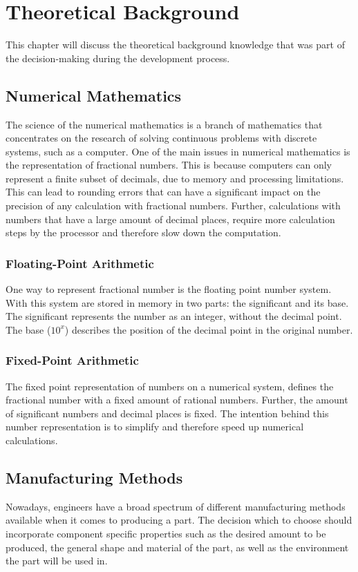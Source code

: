 \chapter{Theoretical Background}
\label{theoretical_background}
 
This chapter will discuss the theoretical background knowledge that was part of the decision-making during the development process.
 
\section{Numerical Mathematics}
The science of the numerical mathematics is a branch of mathematics that concentrates on the research of solving continuous problems with discrete systems, such as a computer.
One of the main issues in numerical mathematics is the representation of fractional numbers. This is because computers can only represent a finite subset of decimals, due to memory and processing limitations.
This can lead to rounding errors that can have a significant impact on the precision of any calculation with fractional numbers.
Further, calculations with numbers that have a large amount of decimal places, require more calculation steps by the processor and therefore slow down the computation.\cite{quarteroni2007numerical}
 
\subsection{Floating-Point Arithmetic}
One way to represent fractional number is the floating point number system. With this system are stored in memory in two parts: the significant and its base. The significant represents the number as an integer, without the decimal point.
The base ($10^x$) describes the position of the decimal point in the original number.\cite{quarteroni2007numerical}
 
\subsection{Fixed-Point Arithmetic}
The fixed point representation of numbers on a numerical system, defines the fractional number with a fixed amount of rational numbers. Further, the amount of significant numbers and decimal places is fixed.
The intention behind this number representation is to simplify and therefore speed up numerical calculations.\cite{quarteroni2007numerical}
 
\section{Manufacturing Methods}
Nowadays, engineers have a broad spectrum of different manufacturing methods available when it comes to producing a part.
The decision which to choose should incorporate component specific properties such as the desired amount to be produced,
the general shape and material of the part, as well as the environment the part will be used in.
 
